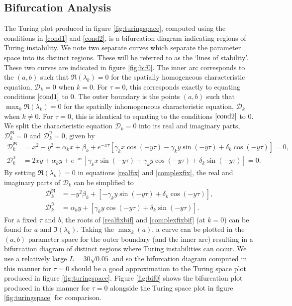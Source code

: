 \subsection{Bifurcation Analysis}\label{section:fixedbif}
The Turing plot produced in figure \ref{fig:turingspace}, computed using the conditions in \eqref{cond1} and \eqref{cond2}, is a bifurcation diagram indicating regions of Turing instability. We note two separate curves which separate the parameter space into its distinct regions. These will be referred to as the `lines of stability'.
These two curves are indicated in figure \ref{fig:bif0}. The inner arc corresponds to the $(a,b)$ such that $\Re(\lambda_k)=0$ for the
spatially homogeneous characteristic equation, $\mathcal{D}_k=0$ when $k=0$. For $\tau=0$, this corresponds exactly to equating conditions $\eqref{cond1}$ to 0. The outer boundary is the points $(a,b)$ such that $\max_k\Re(\lambda_k)=0$ for the spatially inhomogeneous characteristic equation, $\mathcal{D}_k$ when $k\neq0$. For $\tau=0$, this is identical to equating to the conditions $\eqref{cond2}$ to 0. We split the characteristic equation $\mathcal{D}_k=0$ into its real and imaginary parts, $\mathcal{D}_k^{\Re}=0$ and $\mathcal{D}_k^{\Im}=0$, given by
\begin{align}\label{realfix}
\mathcal{D}_k^{\Re}&=x^2-y^2+\alpha_kx+\beta_k+e^{-x\tau}[\gamma_kx\cos(-y\tau)-\gamma_ky\sin(-y\tau)+\delta_k\cos(-y\tau)]=0,\\
\mathcal{D}_k^{\Im}&=2xy+\alpha_ky+e^{-x\tau}[\gamma_kx\sin(-y\tau)+\gamma_ky\cos(-y\tau)+\delta_k\sin(-y\tau)]=0.\label{complexfix}
\end{align}
By setting $\Re(\lambda_k)=0$ in equations \eqref{realfix} and \eqref{complexfix}, the real and imaginary parts of $\mathcal{D}_k$ can be simplified to
\begin{align}\label{realfixbif}
  \mathcal{D}_k^{\Re}&=-y^2\beta_k+[-\gamma_ky\sin(-y\tau)+\delta_k\cos(-y\tau)],\\
  \mathcal{D}_k^{\Im}&=\alpha_ky+[\gamma_ky\cos(-y\tau)+\delta_k\sin(-y\tau)].\label{complexfixbif}
\end{align}
For a fixed $\tau$ and $b$, the roots of \eqref{realfixbif} and \eqref{complexfixbif} (at $k=0$) can be found for $a$ and $\Im(\lambda_k)$.
Taking the $\max_k(a)$, a curve can be plotted in the $(a,b)$ parameter space for the outer boundary (and the inner arc) resulting in a bifurcation diagram of distinct regions where Turing instabilities can occur. We use a relatively large $L=30\sqrt{0.05}$ and so the bifurcation diagram computed in this manner for $\tau=0$ should be a good approximation to the Turing space plot produced in figure \ref{fig:turingspace}. Figure \ref{fig:bif0} shows the bifurcation plot produced in this manner for $\tau=0$ alongside the Turing space plot in figure \ref{fig:turingspace} for comparison.

